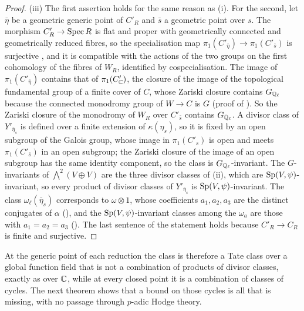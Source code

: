 \begin{proof}
(iii) The first assertion holds for the same reason as (i). For the second,
let $\bar\eta$ be a geometric generic point of $C'_{R}$ and $\bar{s}$ a
geometric point over $s$. The morphism $C'_{R}\to\operatorname{Spec} R$ is flat and proper
with geometrically connected and geometrically reduced fibres, so the
specialisation map $\pi_{1}(C'_{\bar\eta})\to\pi_{1}(C'_{\bar{s}})$ is
surjective \cite[Tag~0C0P]{Stacks}, and it is compatible with the actions of
the two groups on the first cohomology of the fibres of $W_{R}$, identified by
cospecialisation. The image of $\pi_{1}(C'_{\bar\eta})$ contains that of
$\pi_{1}(C'_{\mathbb{C}})$, the closure of the image of the topological fundamental
group of a finite cover of $C$, whose Zariski closure contains
$G_{\mathbb{Q}_{\ell}}$ because the connected monodromy group of $W\to C$ is $G$
(proof of ). So the Zariski closure of the
monodromy of $W_{R}$ over $C'_{\bar{s}}$ contains $G_{\mathbb{Q}_{\ell}}$. A divisor
class of $Y'_{\bar\eta_{s}}$ is defined over a finite extension of
$\kappa(\eta_{s})$, so it is fixed by an open subgroup of the Galois group,
whose image in $\pi_{1}(C'_{s})$ is open \cite[Tag~0BQI]{Stacks} and meets
$\pi_{1}(C'_{\bar{s}})$ in an open subgroup; the Zariski closure of the image
of an open subgroup has the same identity component, so the class is
$G_{\mathbb{Q}_{\ell}}$-invariant. The $G$-invariants of ${\textstyle\bigwedge^{2}}(V\oplus V)$ are the
three divisor classes of (ii), which are
$\operatorname{Sp}(V,\psi)$-invariant, so every product of divisor classes of
$Y'_{\bar\eta_{s}}$ is $\operatorname{Sp}(V,\psi)$-invariant. The class
$\omega_{\ell}(\bar\eta_{s})$ corresponds to $\omega\otimes1$, whose
coefficients $a_{1},a_{2},a_{3}$ are the distinct conjugates of $\alpha$
(), and the $\operatorname{Sp}(V,\psi)$-invariant classes among the
$\omega_{a}$ are those with $a_{1}=a_{2}=a_{3}$ ().
The last sentence of the statement holds because $C'_{R}\to C_{R}$ is finite
and surjective.
\end{proof}

At the generic point of each reduction the class is therefore a Tate class
over a global function field that is not a combination of products of divisor
classes, exactly as over $\mathbb{C}$, while at every closed point it is a
combination of classes of cycles. The next theorem shows that a bound on those
cycles is all that is missing, with no passage through $p$-adic Hodge theory.

